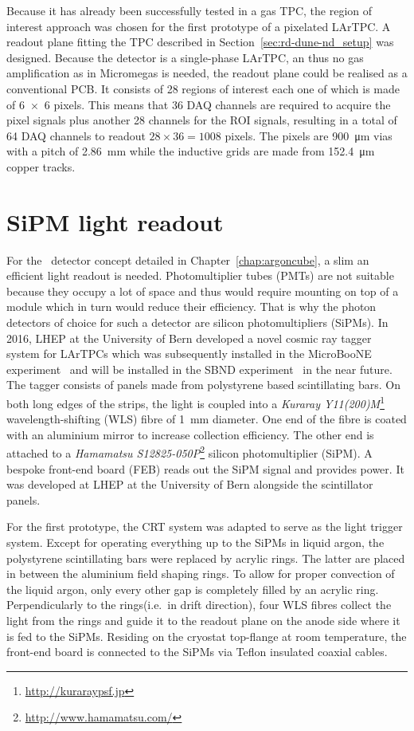 Because it has already been successfully tested in a gas TPC, the region of interest approach was chosen for the first prototype of a pixelated LArTPC.
A readout plane fitting the TPC described in Section~\ref{sec:rd-dune-nd_setup} was designed.
Because the detector is a single-phase LArTPC, an thus no gas amplification as in Micromegas is needed, the readout plane could be realised as a conventional PCB.
It consists of \num{28} regions of interest each one of which is made of \num{6 x 6} pixels.
This means that \num{36} DAQ channels are required to acquire the pixel signals plus another \num{28} channels for the ROI signals, resulting in a total of \num{64} DAQ channels to readout $28 \times 36 = 1008$ pixels.
The pixels are \SI{900}{\micro\metre} vias with a pitch of \SI{2.86}{\milli\metre} while the inductive grids are made from \SI{152.4}{\micro\metre} copper tracks.


\section{SiPM light readout\label{sec:rd-dune-nd_light}}
For the \AC\ detector concept detailed in Chapter~\ref{chap:argoncube}, a slim an efficient light readout is needed.
Photomultiplier tubes (PMTs) are not suitable because they occupy a lot of space and thus would require mounting on top of a module which in turn would reduce their efficiency.
That is why the photon detectors of choice for such a detector are silicon photomultipliers (SiPMs).
In 2016, LHEP at the University of Bern developed a novel cosmic ray tagger system for LArTPCs which was subsequently installed in the MicroBooNE experiment~\cite{uboone} and will be installed in the SBND experiment~\cite{sbnd} in the near future.
The tagger consists of panels made from polystyrene based scintillating bars.
On both long edges of the strips, the light is coupled into a \emph{Kuraray Y11(200)M}\footnote{\href{http://kuraraypsf.jp}{http://kuraraypsf.jp}} wavelength-shifting (WLS) fibre of \SI{1}{\milli\metre} diameter.
One end of the fibre is coated with an aluminium mirror to increase collection efficiency.
The other end is attached to a \emph{Hamamatsu S12825-050P}\footnote{\href{http://www.hamamatsu.com/}{http://www.hamamatsu.com/}} silicon photomultiplier (SiPM).
A bespoke front-end board (FEB) reads out the SiPM signal and provides power.
It was developed at LHEP at the University of Bern alongside the scintillator panels\cite{crt_feb}.

For the first prototype, the CRT system was adapted to serve as the light trigger system.
Except for operating everything up to the SiPMs in liquid argon, the polystyrene scintillating bars were replaced by acrylic rings.
The latter are placed in between the aluminium field shaping rings.
To allow for proper convection of the liquid argon, only every other gap is completely filled by an acrylic ring.
Perpendicularly to the rings(i.e.\ in drift direction), four WLS fibres collect the light from the rings and guide it to the readout plane on the anode side where it is fed to the SiPMs.
Residing on the cryostat top-flange at room temperature, the front-end board is connected to the SiPMs via Teflon insulated coaxial cables.

